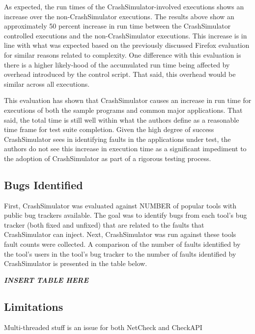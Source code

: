                 As expected, the run times of the CrashSimulator-involved executions shows an increase over the
                non-CrashSimulator executions. The results above show an approximately 50 percent increase in run time
                between the CrashSimulator controlled executions and the non-CrashSimulator executions. This increase is
                in line with what was expected based on the previously discussed Firefox evaluation for similar reasons
                related to complexity. One difference with this evaluation is there is a higher likely-hood of the
                accumulated run time being affected by overhead introduced by the control script. That said, this
                overhead would be similar across all executions.

                This evaluation has shown that CrashSimulator causes an increase in run time for executions of both the
                sample programs and common major applications. That said, the total time is still well within what the
                authors define as a reasonable time frame for test suite completion. Given the high degree of success
                CrashSimulator sees in identifying faults in the applications under test, the authors do not see this
                increase in execution time as a significant impediment to the adoption of CrashSimulator as part of a
                rigorous testing process.

    \subsection{Bugs Identified}

    First, CrashSimulator was evaluated against NUMBER of popular tools with public bug trackers available. The goal was
    to identify bugs from each tool's bug tracker (both fixed and unfixed) that are related to the faults that
    CrashSimulator can inject. Next, CrashSimulator was run against these tools fault counts were collected. A
    comparison of the number of faults identified by the tool's users in the tool's bug tracker to the number of faults
    identified by CrashSimulator is presented in the table below.

    \emph{\textbf{INSERT TABLE HERE}}

    \subsection{Limitations}

        Multi-threaded stuff is an issue for both NetCheck and CheckAPI

